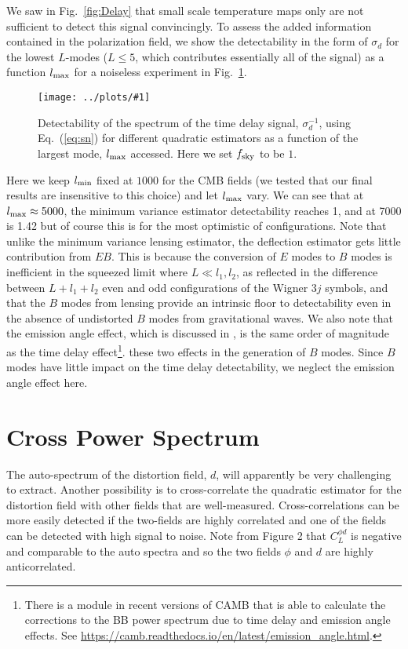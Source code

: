 \documentclass[prd,amsmath,amssymb,floatfix,superscriptaddress,nofootinbib,twocolumn]{revtex4-1}
\newcommand{\ec}[1]{Eq.~(\ref{eq:#1})}
\newcommand{\sfig}[2]{
\texttt{[image: ../plots/\#1]}
        }
\newcommand{\Sfig}[2]{
   \begin{figure}[thbp]
   \begin{center}
    \sfig{#1.pdf}{\columnwidth}
    \caption{{\small #2}}
    \label{fig:#1}
     \end{center}
   \end{figure}
}
\newcommand{\rf}[1]{\ref{fig:#1}}
\newcommand{\peikai}[1]{{\color{blue} #1}}
\begin{document}
We saw in Fig.~\rf{Delay} that small scale temperature maps only are not sufficient to detect this signal convincingly. To assess the added information contained in the polarization field, we show the detectability in the form of $\sigma_d$ for the lowest $L$-modes ($L\leqslant 5$, which contributes essentially all of the signal) as a function $l_{\rm max}$ for a noiseless experiment in Fig.~\rf{StoN}.


\Sfig{StoN}{Detectability of the spectrum of the time delay signal, $\sigma_d^{-1}$, using \ec{sn} for different quadratic estimators as a function of the largest mode, $l_{\rm max}$ accessed. Here we set $f_{\rm sky}$ to be $1$.}

Here we keep $l_{\rm min}$ fixed at $1000$ for the CMB fields (we tested that our final results are insensitive to this choice) and let $l_{\rm max}$ vary.
We can see that at $l_{\rm max} \approx 5000$, the minimum variance estimator detectability reaches 1, and at 7000 is 1.42 but of course this is for the most optimistic of configurations. 
Note that unlike the minimum variance lensing  estimator, the deflection estimator
gets little contribution from $EB$.   This is because the conversion of $E$ modes to $B$
modes is inefficient in the squeezed limit where $L\ll l_1,l_2$, as reflected in the difference between
$L+l_1+l_2$ even and odd configurations of the Wigner 3$j$ symbols, and that the $B$ modes from lensing
provide an intrinsic floor to detectability even in the absence of undistorted $B$ modes
from gravitational waves. \peikai{We also note that the emission angle effect, which is discussed in \cite{Lewis:2017ea}, is the same order of magnitude as the time delay effect\footnote{\peikai{There is a module in recent versions of CAMB that is able to calculate the corrections to the BB power spectrum due to time delay and emission angle effects. See \url{https://camb.readthedocs.io/en/latest/emission_angle.html}.}}. these two effects in the generation of $B$ modes. Since $B$ modes have little impact on the time delay detectability, we neglect the emission angle effect here.}



\section{Cross Power Spectrum}
\label{sec:cross}

The auto-spectrum of the distortion field, $d$, will apparently be very challenging to extract. Another possibility is to cross-correlate the quadratic estimator for the distortion field with other fields that are well-measured. Cross-correlations can be more easily detected if the two-fields are highly correlated and one of the fields can be detected with high signal to noise. Note from Figure 2 that $C^{\phi d}_{L}$ is negative and comparable to the auto spectra and so the two fields $\phi$ and $d$  are highly anticorrelated.
\end{document}
